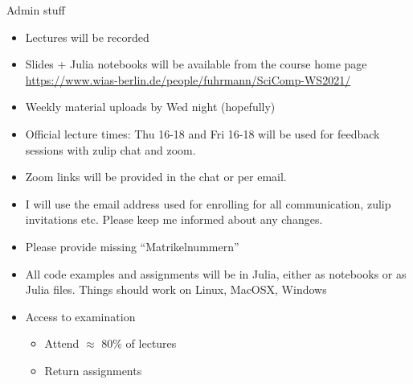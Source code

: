 \begin{frame}{Admin stuff}
  \begin{itemize}
  \item Lectures will be recorded
  \item Slides + Julia notebooks will be available from the course home page
    \url{https://www.wias-berlin.de/people/fuhrmann/SciComp-WS2021/}
  \item Weekly material uploads by Wed night (hopefully)
  \item Official lecture times: Thu 16-18 and Fri 16-18 will be used for
    feedback sessions with zulip chat and zoom. 
  \item Zoom links will be provided in the chat or per email.
  \item I will use the email address used for enrolling for all communication, zulip invitations
    etc. Please keep me informed about any changes.
  \item Please provide missing ``Matrikelnummern''
  \item All code examples and assignments will be in Julia, either as notebooks or
    as Julia files. Things should work on  Linux, MacOSX, Windows
  \item
    Access to examination
    \begin{itemize}
    \item
      Attend \(\approx\) 80\% of lectures
    \item
      Return assignments
    \end{itemize}
  \end{itemize}
  
\end{frame}



